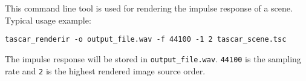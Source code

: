 This command line tool is used for rendering the impulse response of a
\tascar{} scene. Typical usage example:
\begin{lstlisting}[numbers=none]
  tascar_renderir -o output_file.wav -f 44100 -1 2 tascar_scene.tsc
\end{lstlisting}
The impulse response will be stored in
\verb!output_file.wav!. \verb!44100! is the sampling rate and \verb!2!
is the highest rendered image source order.
